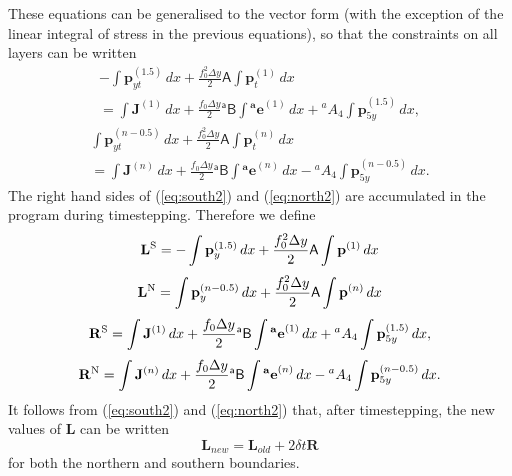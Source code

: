 \documentclass[11pt, a4paper,twoside]{article}
\newcommand{\ah}[1]{{{}^{#1}A_4}}
\newcommand{\vc}[1]{\mathbf{#1}}
\newcommand{\mtx}[1]{\vc{\mathsf{#1}}}
\numberwithin{equation}{section}
\begin{document}
These equations can be generalised to the vector form (with the exception of the linear integral of stress in the previous equations), so that the constraints on all layers can be written 
\begin{multline}\label{eq:south2}
- \int \vc{p}_{yt}^{(1.5)}\, dx  + \frac{f_0^2 \Delta y}{2}\mtx{A}\int \vc{p}_t^{(1)} \, dx \\
= \int \vc{J}^{(1)}\, dx + \frac{f_0 \Delta y}{2}\mtx{{}^a B}\int \vc{{}^a e}^{(1)}\, dx  + \ah{a} \int \vc{p}_{5y}^{(1.5)}\, dx,
\end{multline}
\begin{multline}\label{eq:north2}
\int \vc{p}_{yt}^{(n-0.5)}\, dx  + \frac{f_0^2 \Delta y}{2}\mtx{A}\int \vc{p}_t^{(n)} \, dx \\
= \int \vc{J}^{(n)}\, dx + \frac{f_0 \Delta y}{2}\mtx{{}^a B}\int \vc{{}^a e}^{(n)}\, dx  - \ah{a} \int \vc{p}_{5y}^{(n-0.5)}\, dx.
\end{multline}
The right hand sides of (\ref{eq:south2}) and (\ref{eq:north2}) are accumulated in the program during timestepping. Therefore we define
\[\vc{L}^{\textrm S} = - \int \vc{p}_{y}^{(1.5)}\, dx  + \frac{f_0^2 \Delta y}{2}\mtx{A}\int \vc{p}^{(1)} \, dx\]
\[\vc{L}^{\textrm N} =\int \vc{p}_{y}^{(n-0.5)}\, dx  + \frac{f_0^2 \Delta y}{2}\mtx{A}\int \vc{p}^{(n)} \, dx \]
\[\vc{R}^{\textrm S} =  \int \vc{J}^{(1)}\, dx + \frac{f_0 \Delta y}{2}\mtx{{}^a B}\int \vc{{}^a e}^{(1)}\, dx  + \ah{a} \int \vc{p}_{5y}^{(1.5)}\, dx,\]
\[\vc{R}^{\textrm N} =\int \vc{J}^{(n)}\, dx + \frac{f_0 \Delta y}{2}\mtx{{}^a B}\int \vc{{}^a e}^{(n)}\, dx  - \ah{a} \int \vc{p}_{5y}^{(n-0.5)}\, dx.\]
It follows from (\ref{eq:south2}) and (\ref{eq:north2}) that, after timestepping, the new values of $\vc{L}$ can be written
\[\vc{L}_{new} = \vc{L}_{old} + 2 \delta t \vc{R}\]
for both the northern and southern boundaries.
\end{document}
